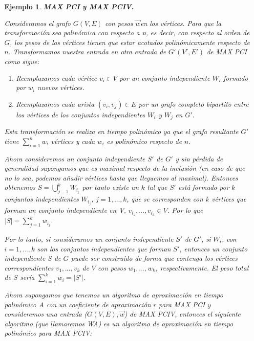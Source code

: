 \documentclass[a4paper,12pt,titlepage]{article}
\newtheorem{eje}{Ejemplo}[section]
\begin{document}
\begin{eje}

\textbf{MAX PCI y MAX PCIV.}\cite{red2}

Consideramos el grafo $G(V,E)$ con pesos $\overrightarrow{w}$en los v\'ertices. Para que la transformaci\'on sea polin\'omica con respecto a n, es decir, con respecto al orden de $G$, los pesos de los v\'ertices tienen que estar acotados polin\'omicamente respecto de $n$. Transformamos nuestra entrada en otra entrada de $G'(V',E')$ de MAX PCI como sigue:

\begin{enumerate}
\item Reemplazamos cada v\'ertice $v_i\in V$ por un conjunto independiente $W_i$ formado por $w_i$ nuevos v\'ertices.
\item Reemplazamos cada arista $(v_i,v_j)\in E$ por un grafo completo bipartito entre los v\'ertices de los conjuntos independientes $W_i$ y $W_j$ en $G'$.
\end{enumerate}

Esta transformaci\'on se realiza en tiempo polin\'omico ya que el grafo resultante $G'$ tiene $\sum_{i=1}^{n} w_i$ v\'ertices y cada $w_i$ es polin\'omico respecto de $n$.

Ahora consideremos un conjunto independiente $S'$ de $G'$ y sin p\'erdida de generalidad supongamos que es maximal respecto de la inclusi\'on (en caso de que no lo sea, podemos añadir v\'ertices hasta que lleguemos al maximal). Entonces obtenemos $S=\bigcup_{j-1}^k W_{i_j}$ por tanto existe un $k$ tal que $S'$ est\'a formado por $k$ conjuntos independientes $W_{i_j}$, $j=1,...,k$, que se corresponden con $k$ v\'ertices que forman un conjunto independiente en V, $v_{i_1},...,v_{i_k}\in V$. Por lo que $|S|=\sum_{j=1}^k w_{i_j}$.

Por lo tanto, si consideramos un conjunto independiente $S'$ de $G'$, si $W_i$, con $i=1,...,k$ son los conjuntos independientes que forman $S'$, entonces un conjunto independiente $S$ de $G$ puede ser construido de forma que contenga los v\'ertices correspondientes $v_1,...,v_k$ de $V$ con pesos $w_1,...,w_k$, respectivamente. El peso total de $S$ ser\'ia $\sum_{i=1}^k w_i=|S'|$.

Ahora supongamos que tenemos un algoritmo de aproximaci\'on en tiempo polin\'omico A con un coeficiente de aproximaci\'on $r$ para MAX PCI y consideremos una entrada ($G(V,E),\overrightarrow{w}$) de MAX PCIV, entonces el siguiente algoritmo (que llamaremos WA) es un algoritmo de aproximaci\'on en tiempo polin\'omico para MAX PCIV:


\end{eje}
\end{document}
